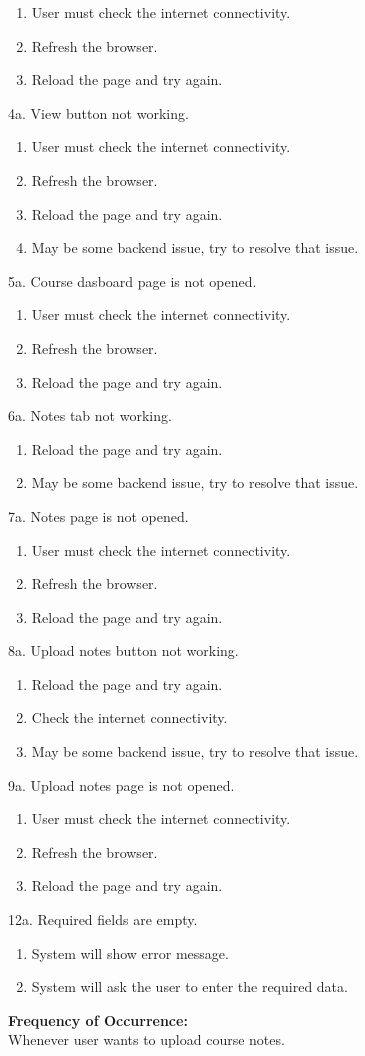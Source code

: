 \begin{enumerate}
\item User must check the internet connectivity.
\item Refresh the browser.
\item Reload the page and try again.
\end{enumerate}
4a. View button not working.
\begin{enumerate}
\item User must check the internet connectivity.
\item Refresh the browser.
\item Reload the page and try again.
\item May be some backend issue, try to resolve that issue.
\end{enumerate}
5a. Course dasboard page is not opened.
\begin{enumerate}
\item User must check the internet connectivity.
\item Refresh the browser.
\item Reload the page and try again.
\end{enumerate}
6a. Notes tab not working.
\begin{enumerate}
\item Reload the page and try again.
\item May be some backend issue, try to resolve that issue.
\end{enumerate}
7a. Notes page is not opened.
\begin{enumerate}
\item User must check the internet connectivity.
\item Refresh the browser.
\item Reload the page and try again.
\end{enumerate}
8a. Upload notes button not working.
\begin{enumerate}
\item Reload the page and try again.
\item Check the internet connectivity.
\item May be some backend issue, try to resolve that issue.
\end{enumerate}
9a. Upload notes page is not opened.
\begin{enumerate}
\item User must check the internet connectivity.
\item Refresh the browser.
\item Reload the page and try again.
\end{enumerate}
12a. Required fields are empty.
\begin{enumerate}
\item System will show error message.
\item System will ask the user to enter the required data. 
\end{enumerate}
\textbf{Frequency of Occurrence:}\\
Whenever user wants to upload course notes.



